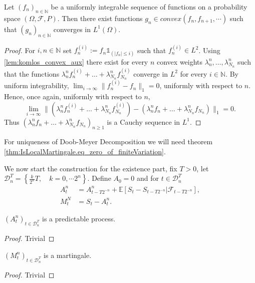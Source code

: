 \begin{lemma}\label{lem:komlos}
  Let $( f_n)_{n\in\mathbb{N}}$ be a uniformly integrable sequence of functions on a probability space $(\Omega , \mathcal{F} , P)$.
  Then there exist functions $g_n \in convex( f_n, f_{n+1}, \cdots)$ such that $(g_n)_{n\in\mathbb{N}}$ converges in  $L^1 (\Omega )$.
\end{lemma}
\begin{proof}
  For $i,n\in\mathbb{N}$ set $f_{n}^{(i)}:=f_n \mathbb{1}_{(|f_n|\leq i)}$ such that $f_{n}^{(i)}\in L^2$.
  Using \ref{lem:komlos_convex_aux} there exist for every $n$ convex weights $\lambda_n^{n}, \ldots, \lambda_{N_n}^{n}$ such that the functions
  $ \lambda_n^{n} f_n^{(i)} + \ldots+\lambda_{N_n}^{n} f_{N_n}^{(i)}$ converge in $L^2$ for every $i\in\mathbb{N}$.
  By uniform integrability, $\lim_{i\to \infty}\| f^{(i)}_n- f_n\|_1=0$, uniformly with respect to $n$.
  Hence, once again, uniformly with respect to $n$,
  $$ \textstyle\lim_{i\to\infty}\|  (\lambda_n^{n} f_n^{(i)} + \ldots+\lambda_{N_n}^{n} f_{N_n}^{(i)})-(\lambda_n^{n} f_n + \ldots+\lambda_{N_n}^{n} f_{N_n})\|_1= 0.$$
  Thus $(\lambda_n^{n} f_n + \ldots+\lambda_{N_n}^{n} f_{N_n})_{n\geq 1}$  is a Cauchy sequence in $L^1$.
\end{proof}

For uniqueness of Doob-Meyer Decomposition we will need theorem \ref{thm:IsLocalMartingale.eq_zero_of_finiteVariation}.

We now start the construction for the existence part, fix $T>0$, let $\mathcal{D}_n^T=\left\lbrace \frac{k}{2^n}T,\quad k=0,\cdots 2^n\right\rbrace$. Define $A_0=0$ and for $t\in\mathcal{D}_n^T$
\begin{align*}
A^n_t&=A^n_{t-T2^{-n}} + \mathbb{E}\left[ S_t-S_{t-T2^{-n}}|\mathcal{F}_{t-T2^{-n}}\right],\\
M^N_t&=S_t-A^n_t.
\end{align*}

\begin{lemma}\label{lem:Doob_Meyer_Finite_Predictable}
  $(A^n_t)_{t\in\mathcal{D}_n^T}$ is a predictable process.
\end{lemma}
\begin{proof}
  Trivial
\end{proof}

\begin{lemma}\label{lem:Doob_Meyer_Finite_Martingale}
  $(M^n_t)_{t\in\mathcal{D}_n^T}$ is a martingale.
\end{lemma}
\begin{proof}
  Trivial
\end{proof}

